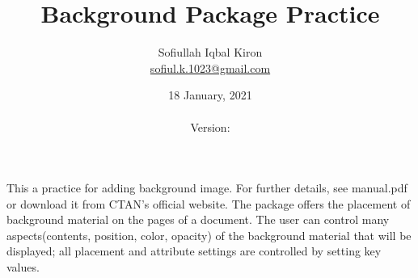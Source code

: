 \documentclass[10pt, a4paper]{article}
\title{Background Package Practice}
\author
{
	Sofiullah Iqbal Kiron\\
	\href{mailto:sofiul.k.1023@gmail.com}{sofiul.k.1023@gmail.com}
}
\date{18 January, 2021 \\ \currenttime \\ Version: \version}
\affil
{
	BSMRSTU, Department of CSE \\
	SHIICT \\
	{\tiny Copyright\faCopyright\hspace{2pt} under Sofiullah Book Agency Publishing Section}
}
\begin{document}


\maketitle

\justify
{}
This a practice for adding background image. For further details, see manual.pdf or download it from CTAN's official website. The package offers the placement of background material on the pages of a document. The user can control many aspects(contents, position, color, opacity) of the background material that will be displayed; all placement and attribute settings are controlled by setting key values. \\ \\
\end{document}
